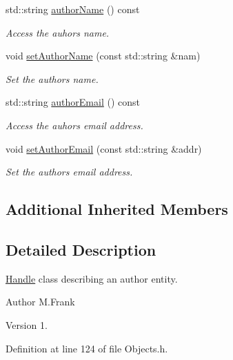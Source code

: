 \begin{DoxyCompactItemize}
std\+::string \hyperlink{class_d_d4hep_1_1_geometry_1_1_author_a3b434ef224a2ca41cce53314117048b0}{author\+Name} () const
\begin{DoxyCompactList}\small\item\em Access the auhor\textquotesingle{}s name. \end{DoxyCompactList}\item 
void \hyperlink{class_d_d4hep_1_1_geometry_1_1_author_aca1a9559e7b890d4b817b1a5286a034a}{set\+Author\+Name} (const std\+::string \&nam)
\begin{DoxyCompactList}\small\item\em Set the author\textquotesingle{}s name. \end{DoxyCompactList}\item 
std\+::string \hyperlink{class_d_d4hep_1_1_geometry_1_1_author_ab64f51f7009764bbd3ca46b758302099}{author\+Email} () const
\begin{DoxyCompactList}\small\item\em Access the auhor\textquotesingle{}s email address. \end{DoxyCompactList}\item 
void \hyperlink{class_d_d4hep_1_1_geometry_1_1_author_a0e51de9a1fef12422800b96164296ae4}{set\+Author\+Email} (const std\+::string \&addr)
\begin{DoxyCompactList}\small\item\em Set the author\textquotesingle{}s email address. \end{DoxyCompactList}\end{DoxyCompactItemize}
\subsection*{Additional Inherited Members}


\subsection{Detailed Description}
\hyperlink{class_d_d4hep_1_1_handle}{Handle} class describing an author entity. 

\begin{DoxyAuthor}{Author}
M.\+Frank 
\end{DoxyAuthor}
\begin{DoxyVersion}{Version}
1. 
\end{DoxyVersion}


Definition at line 124 of file Objects.\+h.



